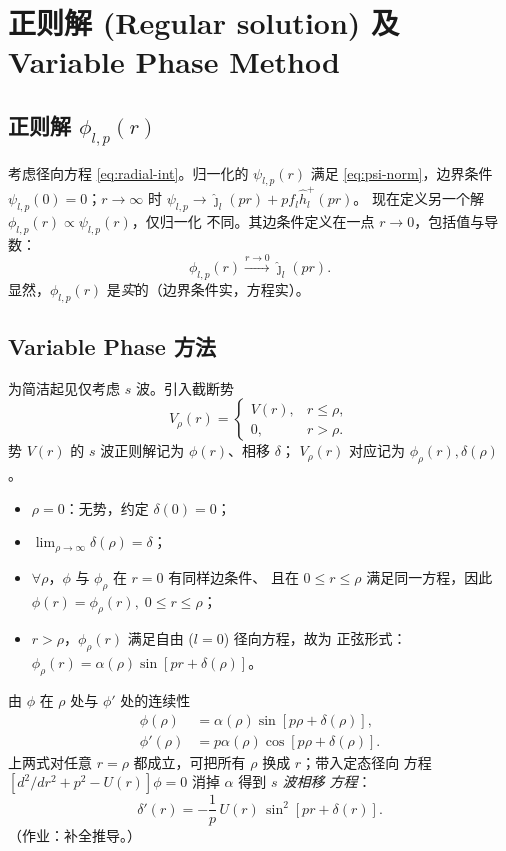 \section{正则解 (Regular solution) 及 Variable Phase Method}\label{sec:regular}

\subsection{正则解 $\phi_{l,p}(r)$}

考虑径向方程 \eqref{eq:radial-int}。归一化的 $\psi_{l,p}(r)$ 满足
\eqref{eq:psi-norm}，边界条件
$\psi_{l,p}(0)=0$；$r\to\infty$ 时
$\psi_{l,p}\to\hat\jmath_l(pr)+pf_l\hat h_l^+(pr)$。
现在定义另一个解 $\phi_{l,p}(r)\propto \psi_{l,p}(r)$，仅归一化
不同。其边条件定义在一点 $r\to0$，包括值与导数：
\begin{equation}\label{eq:phi-bc}
\phi_{l,p}(r)\xrightarrow{r\to 0}\hat\jmath_l(pr).
\end{equation}
显然，$\phi_{l,p}(r)$ 是\emph{实}的（边界条件实，方程实）。

\subsection{Variable Phase 方法}

为简洁起见仅考虑 $s$ 波。引入截断势
\begin{equation}
V_\rho(r)=\begin{cases} V(r), & r\le \rho,\\ 0,& r>\rho.\end{cases}
\end{equation}
势 $V(r)$ 的 $s$ 波正则解记为 $\phi(r)$、相移 $\delta$；
$V_\rho(r)$ 对应记为 $\phi_\rho(r),\delta(\rho)$。
\begin{itemize}
\item $\rho=0$：无势，约定 $\delta(0)=0$；
\item $\lim_{\rho\to\infty}\delta(\rho)=\delta$；
\item $\forall\rho$，$\phi$ 与 $\phi_\rho$ 在 $r=0$ 有同样边条件、
  且在 $0\le r\le\rho$ 满足同一方程，因此
  $\phi(r)=\phi_\rho(r),\;0\le r\le\rho$；
\item $r>\rho$，$\phi_\rho(r)$ 满足自由 ($l=0$) 径向方程，故为
  正弦形式：$\phi_\rho(r)=\alpha(\rho)\sin[pr+\delta(\rho)]$。
\end{itemize}
由 $\phi$ 在 $\rho$ 处与 $\phi'$ 处的连续性
\begin{align}
\phi(\rho)&=\alpha(\rho)\sin[p\rho+\delta(\rho)],\\
\phi'(\rho)&=p\alpha(\rho)\cos[p\rho+\delta(\rho)].
\end{align}
上两式对任意 $r=\rho$ 都成立，可把所有 $\rho$ 换成 $r$；带入定态径向
方程 $[d^2/dr^2+p^2-U(r)]\phi=0$ 消掉 $\alpha$ 得到 \emph{$s$ 波相移
方程}：
\begin{equation}\label{eq:variable-phase}
\boxed{\;\delta'(r)=-\frac{1}{p}\,U(r)\,\sin^2[pr+\delta(r)].\;}
\end{equation}
（作业：补全推导。）

